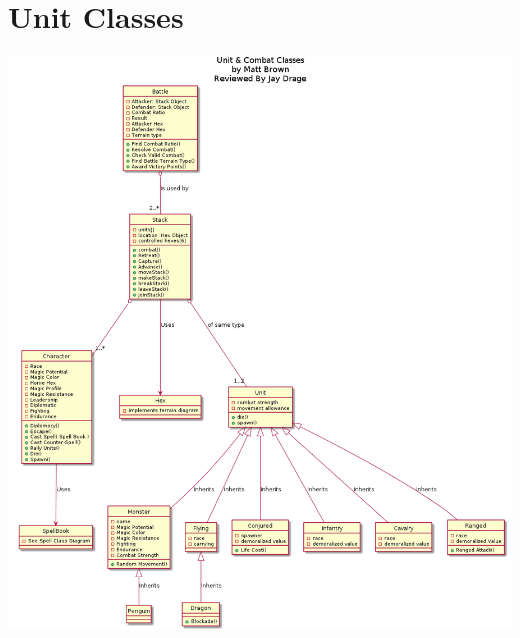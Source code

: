 \documentclass{article}
\begin{document}
\section{Unit Classes}
\includegraphics[width=\textwidth]{pngs/UnitClasses.png}




\end{document}
